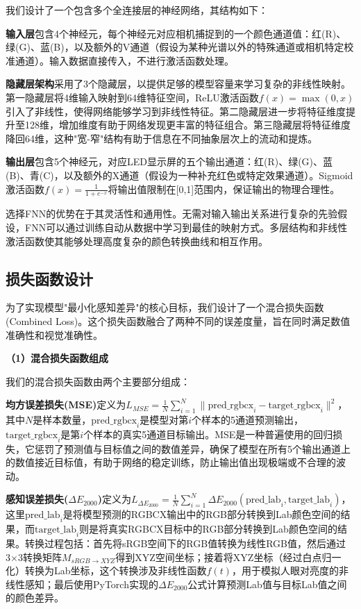 我们设计了一个包含多个全连接层的神经网络，其结构如下：

\textbf{输入层}包含4个神经元，每个神经元对应相机捕捉到的一个颜色通道值：红(R)、绿(G)、蓝(B)，以及额外的V通道（假设为某种光谱以外的特殊通道或相机特定校准通道）。输入数据直接传入，不进行激活函数处理。

\textbf{隐藏层架构}采用了3个隐藏层，以提供足够的模型容量来学习复杂的非线性映射。第一隐藏层将4维输入映射到64维特征空间，ReLU激活函数$f(x) = \max(0, x)$引入了非线性，使得网络能够学习到非线性特征。第二隐藏层进一步将特征维度提升至128维，增加维度有助于网络发现更丰富的特征组合。第三隐藏层将特征维度降回64维，这种"宽-窄"结构有助于信息在不同抽象层次上的流动和提炼。

\textbf{输出层}包含5个神经元，对应LED显示屏的五个输出通道：红(R)、绿(G)、蓝(B)、青(C)，以及额外的X通道（假设为一种补充红色或特定效果通道）。Sigmoid激活函数$f(x) = \frac{1}{1+e^{-x}}$将输出值限制在[0,1]范围内，保证输出的物理合理性。

选择FNN的优势在于其灵活性和通用性。无需对输入输出关系进行复杂的先验假设，FNN可以通过训练自动从数据中学习到最佳的映射方式。多层结构和非线性激活函数使其能够处理高度复杂的颜色转换曲线和相互作用。\cite{1024493909.nh}

\subsection[\hspace{-2pt}损失函数设计]{{\heiti{} \hspace{-8pt}损失函数设计}}\label{section2: 损失函数设计}

为了实现模型"最小化感知差异"的核心目标，我们设计了一个混合损失函数 (Combined Loss)。这个损失函数融合了两种不同的误差度量，旨在同时满足数值准确性和视觉准确性。

\noindent\textbf{（1）混合损失函数组成}

我们的混合损失函数由两个主要部分组成：

\textbf{均方误差损失(MSE)}定义为$ L_{MSE} = \frac{1}{N} \sum_{i=1}^N \| \text{pred\_rgbcx}_i - \text{target\_rgbcx}_i \|^2 $，其中$N$是样本数量，$\text{pred\_rgbcx}_i$是模型对第$i$个样本的5通道预测输出，$\text{target\_rgbcx}_i$是第$i$个样本的真实5通道目标输出。MSE是一种普遍使用的回归损失，它惩罚了预测值与目标值之间的数值差异，确保了模型在所有5个输出通道上的数值接近目标值，有助于网络的稳定训练，防止输出值出现极端或不合理的波动。

\textbf{感知误差损失($\Delta E_{2000}$)}定义为$ L_{\Delta E_{2000}} = \frac{1}{N} \sum_{i=1}^N \Delta E_{2000}(\text{pred\_lab}_i, \text{target\_lab}_i) $，这里$\text{pred\_lab}_i$是将模型预测的RGBCX输出中的RGB部分转换到Lab颜色空间的结果，而$\text{target\_lab}_i$则是将真实RGBCX目标中的RGB部分转换到Lab颜色空间的结果。转换过程包括：首先将sRGB空间下的RGB值转换为线性RGB值，然后通过3×3转换矩阵$M_{sRGB \to XYZ}$得到XYZ空间坐标；接着将XYZ坐标（经过白点归一化）转换为Lab坐标，这个转换涉及非线性函数$f(t)$，用于模拟人眼对亮度的非线性感知；最后使用PyTorch实现的$\Delta E_{2000}$公式计算预测Lab值与目标Lab值之间的颜色差异。

